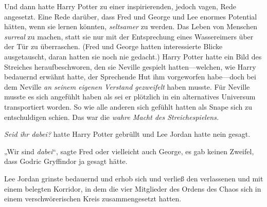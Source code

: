 Und dann hatte Harry Potter zu einer inspirierenden, jedoch vagen, Rede angesetzt. Eine Rede darüber, dass Fred und George und Lee enormes Potential hätten, wenn sie lernen könnten, \emph{seltsamer} zu werden. Das Leben von Menschen \emph{surreal} zu machen, statt sie nur mit der Entsprechung eines Wassereimers über der Tür zu überraschen. (Fred und George hatten interessierte Blicke ausgetauscht, daran hatten sie noch nie gedacht.) Harry Potter hatte ein Bild des Streiches heraufbeschworen, den sie Neville gespielt hatten—welchen, wie Harry bedauernd erwähnt hatte, der Sprechende Hut ihm vorgeworfen habe—doch bei dem Neville \emph{an seinem eigenen Verstand gezweifelt} haben musste. Für Neville musste es sich angefühlt haben als sei er plötzlich in ein alternatives Universum transportiert worden. So wie alle anderen sich gefühlt hatten als Snape sich zu entschuldigen schien. Das war die \emph{wahre Macht des Streichespielens.}

\emph{Seid ihr dabei?} hatte Harry Potter gebrüllt und Lee Jordan hatte nein gesagt.

„Wir sind \emph{dabei}“, sagte Fred oder vielleicht auch George, es gab keinen Zweifel, dass Godric Gryffindor ja gesagt hätte.

Lee Jordan grinste bedauernd und erhob sich und verließ den verlassenen und mit einem  belegten Korridor, in dem die vier Mitglieder des Ordens des Chaos sich in einem verschwörerischen Kreis zusammengesetzt hatten.

